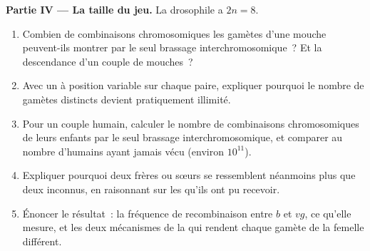 \begin{problem}
\medskip
\noindent\textbf{Partie IV --- La taille du jeu.}
La drosophile a $2n = 8$.
\begin{enumerate}[resume]
  \item Combien de combinaisons chromosomiques les gamètes d'une mouche
        peuvent-ils montrer par le seul brassage interchromosomique~?
        Et la descendance d'un couple de mouches~?
  \item Avec un  à position variable sur chaque paire,
        expliquer pourquoi le nombre de gamètes distincts devient
        pratiquement illimité.
  \item Pour un couple humain, calculer le nombre de combinaisons
        chromosomiques de leurs enfants par le seul brassage
        interchromosomique, et comparer au nombre d'humains ayant
        jamais vécu (environ $10^{11}$).
  \item Expliquer pourquoi deux frères ou sœurs se ressemblent
        néanmoins plus que deux inconnus, en raisonnant sur les 
        qu'ils ont pu recevoir.
  \item Énoncer le résultat~: la fréquence de recombinaison entre $b$
        et $vg$, ce qu'elle mesure, et les deux mécanismes de la 
        qui rendent chaque gamète de la femelle différent.
\end{enumerate}
\end{problem}
